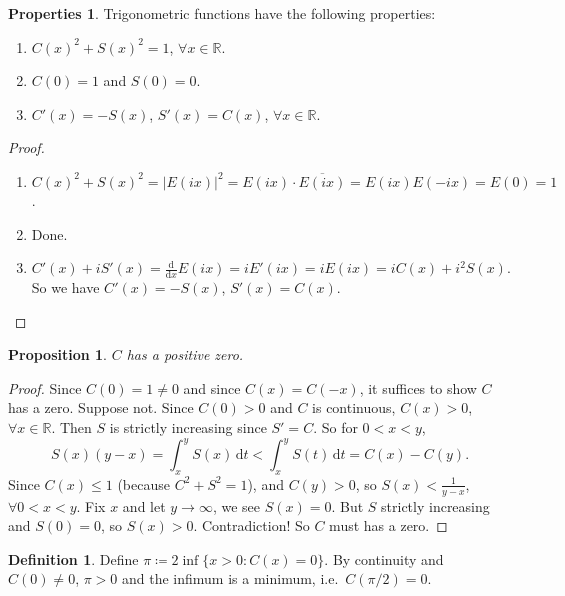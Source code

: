 \documentclass[12pt]{article}
\theoremstyle{plain}
\newtheorem*{prop}{Proposition}
\theoremstyle{definition}
\newtheorem*{defn}{Definition}
\newtheorem*{property}{Properties}
\begin{document}
\begin{property}
    Trigonometric functions have the following properties:
    \begin{enumerate}
        \item $C(x)^2 + S(x)^2=1$, $\forall x\in\mathbb{R}$.
        \item $C(0) = 1$ and $S(0) = 0$.
        \item $C'(x) = -S(x)$, $S'(x) = C(x)$, $\forall x\in \mathbb{R}$.
    \end{enumerate}
\end{property}
\begin{proof}
    \begin{enumerate}
        \item $C(x)^2+S(x)^2 = \left|E(ix)\right|^2 = E(ix)\cdot\overline{E(ix)} = E(ix)E(-ix) = E(0) = 1$.
        \item Done.
        \item $C'(x) + iS'(x) = \frac{\mathrm{d}}{\mathrm{d}x}E(ix) = iE'(ix)=iE(ix) = iC(x) + i^2S(x)$.
            So we have $C'(x) = -S(x)$, $S'(x) = C(x)$.
    \end{enumerate}
\end{proof}

\begin{prop}
    $C$ has a positive zero.
\end{prop}
\begin{proof}
    Since $C(0) = 1\neq 0$ and since $C(x) = C(-x)$, it suffices to show $C$ has a zero.
    Suppose not.
    Since $C(0) > 0$ and $C$ is continuous, $C(x) > 0$, $\forall x\in\mathbb{R}$. Then $S$ is strictly increasing since
    $S'=C$.
    So for $0<x<y$, 
    \[S(x)(y-x) = \int_x^y S(x)\,\mathrm{d}t<\int_x^y S(t)\,\mathrm{d}t = C(x)-C(y).\]
    Since $C(x)\leq 1$ (because $C^2+S^2=1$), and $C(y)> 0$, so 
    $S(x)<\frac{1}{y-x}$, $\forall 0<x<y$.
    Fix $x$ and let $y\rightarrow \infty$, we see $S(x) = 0$.
    But $S$ strictly increasing and $S(0) = 0$, so $S(x) > 0$.
    Contradiction!
    So $C$ must has a zero.
\end{proof}

\begin{defn}
    Define $\pi\coloneqq 2 \inf\{x>0:C(x) = 0\}$.
    By continuity and $C(0)\neq 0$, $\pi > 0$ and the infimum is a minimum, i.e.\ $C(\pi/2) = 0$.
\end{defn}
\end{document}
